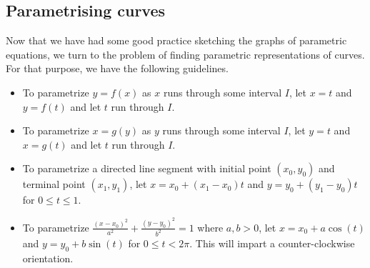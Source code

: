 \subsection{Parametrising curves}
\ifcourse
	\checkoddpage
{}
 \fi
Now that we have had some good practice sketching the graphs of parametric equations, we turn to the problem of finding parametric representations of curves.  For that purpose, we have the following guidelines. 

\begin{itemize}

\item  To parametrize $y=f(x)$ as $x$ runs through some interval $I$, let $x=t$ and $y=f(t)$ and let $t$ run through $I$.

\item  To parametrize $x=g(y)$ as $y$ runs through some interval $I$, let  $y=t$ and $x=g(t)$ and  let $t$ run through $I$.

\item  To parametrize a directed line segment with initial point $(x_0, y_0)$ and terminal point $(x_1, y_1)$, let $x = x_0 + (x_1- x_0) t$ and $y = y_0 + (y_1 - y_0) t$ for $0 \leq t \leq 1$.

\item  To parametrize  $\frac{(x-x_0)^2}{a^2} + \frac{(y-y_0)^2}{b^2} = 1$ where $a,b > 0$, let $x = x_0+a\cos(t)$ and $y=y_0+b\sin(t)$ for $0 \leq t < 2\pi$.  This will impart a counter-clockwise orientation.

\end{itemize}


